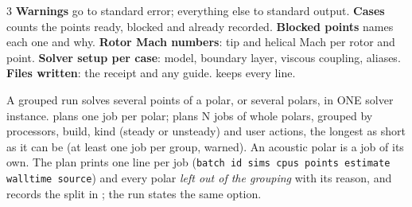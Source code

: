 \begin{multicols}{3}
\textbf{Warnings} go to standard error; everything else to standard output. \textbf{Cases} counts the points ready, blocked and already recorded. \textbf{Blocked points} names each one and why. \textbf{Rotor Mach numbers}: tip and helical Mach per rotor and point. \textbf{Solver setup per case}: model, boundary layer, viscous coupling, aliases. \textbf{Files written}: the receipt and any guide.  keeps every line.

A grouped run solves several points of a polar, or several polars, in ONE solver instance.  plans one job per polar;  plans N jobs of whole polars, grouped by processors, build, kind (steady or unsteady) and user actions, the longest as short as it can be (at least one job per group, warned). An acoustic polar is a job of its own. The plan prints one line per job (\texttt{batch id sims cpus points estimate walltime source}) and every polar \textit{left out of the grouping} with its reason, and records the split in ; the run states the same option.


\end{multicols}

